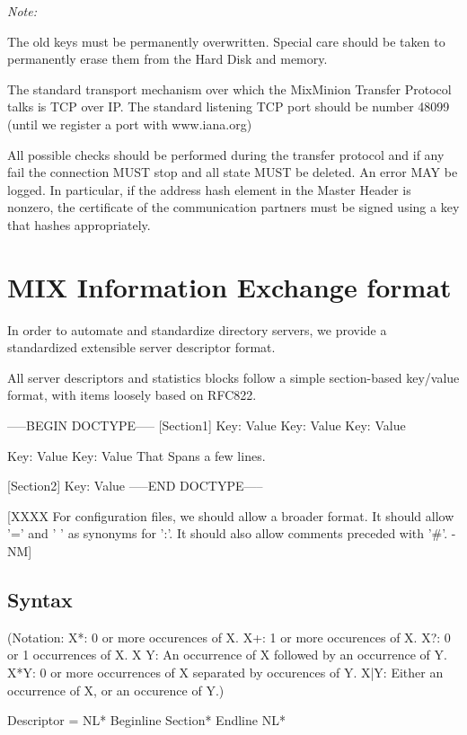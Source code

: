 \emph{Note:}

The old keys must be permanently overwritten. Special care should be
taken to permanently erase them from the Hard Disk and memory. 

The standard transport mechanism over which the MixMinion Transfer
Protocol talks is TCP over IP. The standard listening TCP port should be 
number 48099 (until we register a port with www.iana.org)

All possible checks should be performed during the transfer protocol
and if any fail the connection MUST stop and all state MUST
be deleted. An error MAY be logged. In particular, if the address
hash element in the Master Header is nonzero, the certificate of
the communication partners must be signed using a key that hashes
appropriately.

\section{MIX Information Exchange format}

In order to automate and standardize directory servers, we provide 
a standardized extensible server descriptor format.

All server descriptors and statistics blocks follow a simple
section-based key/value format, with items loosely based on RFC822.

-----BEGIN DOCTYPE-----
[Section1]
Key: Value
Key: Value
Key: Value

Key: Value
Key: Value
 That
 Spans a few lines.

[Section2]
Key: Value
-----END DOCTYPE-----

[XXXX For configuration files, we should allow a broader format.  It
  should allow '=' and ' ' as synonyms for ':'.  It should also allow
  comments preceded with '#'. -NM]

\subsection{Syntax}

(Notation:  X*: 0 or more occurences of X.
            X+: 1 or more occurences of X.
	    X?: 0 or 1 occurrences of X.
            X Y: An occurrence of X followed by an occurrence of Y.
	    X*{Y}: 0 or more occurrences of X separated by occurences
                  of Y.
            X|Y: Either an occurrence of X, or an occurence of Y.)

Descriptor = NL* Beginline Section* Endline NL*

